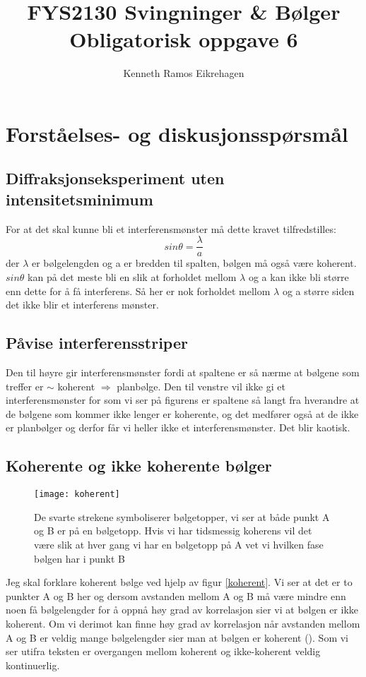 \documentclass[a4paper,12pt,norsk]{article}
\title{FYS2130 Svingninger \& Bølger \\Obligatorisk oppgave 6}
\author{Kenneth Ramos Eikrehagen}
\begin{document}
\maketitle
\newpage
\tableofcontents
\listoffigures
\newpage


\section{Forståelses- og diskusjonsspørsmål}
\subsection{Diffraksjonseksperiment uten intensitetsminimum}
For at det skal kunne bli et interferensmønster må dette kravet tilfredstilles: 
$$
sin\theta = \frac{\lambda}{a}
$$
der $\lambda$ er bølgelengden og a er bredden til spalten, bølgen må også være koherent. 
$sin\theta$ kan på det meste bli en slik at forholdet mellom $\lambda$ og a kan ikke bli større enn dette for å få interferens. Så her er nok forholdet mellom $\lambda$ og a større siden det ikke blir et interferens mønster.


\subsection{Påvise interferensstriper}
Den til høyre gir interferensmønster fordi at spaltene er så nærme at bølgene som treffer er $\sim$ koherent $\Rightarrow$ planbølge. Den til venstre vil ikke gi et interferensmønster for som vi ser på figurens er spaltene så langt fra hverandre at de bølgene som kommer ikke lenger er koherente, og det medfører også at de ikke er planbølger og derfor får vi heller ikke et interferensmønster. Det blir kaotisk. 

\subsection{Koherente og ikke koherente bølger}
\begin{figure}
\texttt{[image: koherent]}\\
\caption[Bølger]{De svarte strekene symboliserer bølgetopper, vi ser at både punkt A og B er på en bølgetopp. Hvis vi har tidsmessig koherens vil det være slik at hver gang vi har en bølgetopp på A vet vi hvilken fase bølgen har i punkt B}
\label{koherent}
\end{figure}
Jeg skal forklare koherent bølge ved hjelp av figur \vref{koherent}. Vi ser at det er to punkter A og B her og dersom avstanden mellom A og B må være mindre enn noen få bølgelengder for å oppnå høy grad av korrelasjon sier vi at bølgen er ikke koherent. Om vi derimot kan finne høy grad av korrelasjon når avstanden mellom A og B er veldig mange bølgelengder sier man at bølgen er koherent (\cite{boka}). Som vi ser utifra teksten er overgangen mellom koherent og ikke-koherent veldig kontinuerlig.
\end{document}
